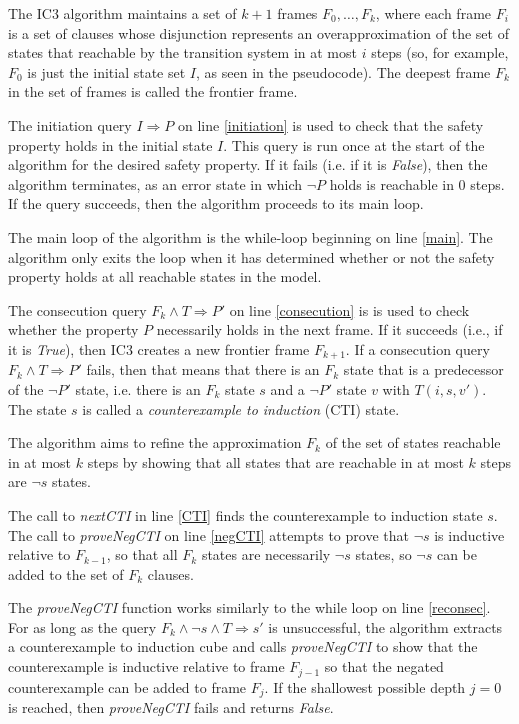 \documentclass[12pt,a4paper,twoside,openright]{report}
\begin{document}
{The IC3 algorithm maintains a set of $k + 1$ frames $F_0,\ldots,F_k$, where
each frame $F_i$ is a set of clauses whose disjunction represents an
overapproximation of the set of states that reachable by the transition
system in at most $i$ steps
(so, for example, $F_0$ is just the initial state set $I$, as seen
in the pseudocode).
The deepest frame $F_k$ in the set of frames is called the frontier frame.

The initiation query $I \Rightarrow P$ on line \ref{initiation} is used to check that the safety
property holds in the initial state $I$.
This query is run once at the start of
the algorithm for the desired safety property.
If it fails (i.e. if it is {\it False}), then the algorithm terminates,
as an error state in which $\neg P$ holds is reachable in 0 steps.
If the query succeeds, then the algorithm proceeds to its main loop.

The main loop of the algorithm is the while-loop beginning on line \ref{main}.
The algorithm only exits the loop when it has determined whether or not the
safety property holds at all reachable states in the model.

The consecution query $F_k \wedge T \Rightarrow P'$ on line \ref{consecution} is
is used to check whether the property $P$ necessarily holds in the next
frame. If it succeeds (i.e., if it is {\it True}), then IC3 creates a new
frontier frame $F_{k + 1}$.
If a consecution query $F_k \wedge T \Rightarrow P'$ fails, then that means that
there is an $F_k$ state that is a predecessor of the $\neg P'$ state,
i.e. there is an $F_k$ state $s$ and a $\neg P'$ state $v$ with $T(i,s,v')$.
The state $s$ is called a \emph{counterexample to induction} (CTI) state.

The algorithm aims to refine the approximation $F_k$ of the set of states
reachable in at most $k$ steps by showing that all states that are
reachable in at most $k$ steps are $\neg s$ states.

The call to {\it nextCTI} in line \ref{CTI} finds the counterexample to
induction state $s$. The call to {\it proveNegCTI} on line \ref{negCTI}
attempts to prove that $\neg s$ is inductive relative to $F_{k - 1}$,
so that all $F_k$ states are necessarily $\neg s$ states, so $\neg s$ can
be added to the set of $F_k$ clauses.

The {\it proveNegCTI} function works similarly to the
while loop on line \ref{reconsec}. For as long as the query
$F_k \wedge \neg s \wedge T \Rightarrow s'$ is unsuccessful,
the algorithm extracts a counterexample to induction cube and
calls {\it proveNegCTI} to show that the counterexample is
inductive relative to frame $F_{j - 1}$ so that the negated
counterexample can be added to frame $F_j$.
If the shallowest possible depth $j = 0$ is reached, then
{\it proveNegCTI} fails and returns {\it False}.

}
\end{document}

